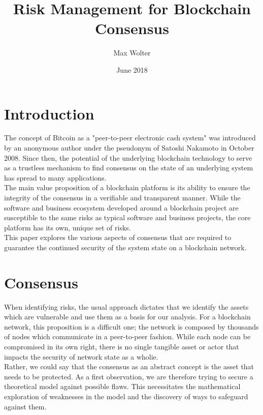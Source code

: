 \documentclass[11pt,a4paper,draft]{article}
\title{Risk Management for Blockchain Consensus}
\author{Max Wolter}
\date{June 2018}
\begin{document}
\maketitle

\begin{abstract}

\end{abstract}

\section{Introduction}

The concept of Bitcoin as a "peer-to-peer electronic cash system" was introduced by an anonymous author under the pseudonym of Satoshi Nakamoto in October 2008. Since then, the potential of the underlying blockchain technology to serve as a trustless mechanism to find consensus on the state of an underlying system has spread to many applications.\\

The main value proposition of a blockchain platform is its ability to ensure the integrity of the consensus in a verifiable and transparent manner. While the software and business ecosystem developed around a blockchain project are susceptible to the same risks as typical software and business projects, the core platform has its own, unique set of risks.\\

This paper explores the various aspects of consensus that are required to guarantee the continued security of the system state on a blockchain network.\\

\section{Consensus}

When identifying risks, the usual approach dictates that we identify the assets which are vulnerable and use them as a basis for our analysis. For a blockchain network, this proposition is a difficult one; the network is composed by thousands of nodes which communicate in a peer-to-peer fashion. While each node can be compromised in its own right, there is no single tangible asset or actor that impacts the security of network state as a wholie.\\

Rather, we could say that the consensus as an abstract concept is the asset that needs to be protected. As a first observation, we are therefore trying to secure a theoretical model against possible flaws. This necessitates the mathematical exploration of weaknesses in the model and the discovery of ways to safeguard against them.\\
\end{document}
